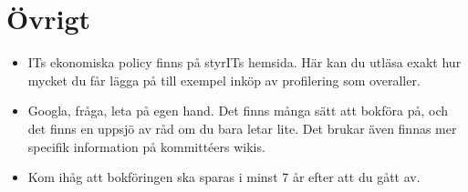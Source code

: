 \documentclass{article}
\begin{document}

\section{Övrigt}
\begin{itemize}
    \item ITs ekonomiska policy finns på styrITs hemsida. Här kan du utläsa exakt hur mycket du får lägga på till exempel inköp av profilering som overaller.
    \item Googla, fråga, leta på egen hand. Det finns många sätt att bokföra på, och det finns en
uppsjö av råd om du bara letar lite. Det brukar även finnas mer specifik information på
kommittéers wikis.
    \item Kom ihåg att bokföringen ska sparas i minst 7 år efter att du gått av.
\end{itemize}
\end{document}
